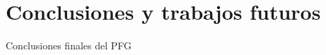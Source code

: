 \chapter{Conclusiones y trabajos futuros}
\label{ch:Conclusiones y trabajos futuros}

Conclusiones finales del PFG